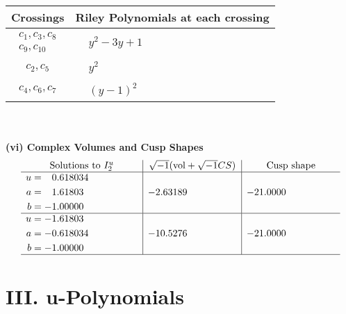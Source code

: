 \documentclass[1p]{elsarticle_modified}
\theoremstyle{definition}
\newcommand{\I}{\sqrt{-1}}
\begin{document}
\begin{tabular}{m{50pt}|m{274pt}}
Crossings & \hspace{64pt}Riley Polynomials at each crossing \\
\hline $$\begin{aligned}c_{1},c_{3},c_{8}\\c_{9},c_{10}\end{aligned}$$&$\begin{aligned}
&y^2-3 y+1
\end{aligned}$\\
\hline $$\begin{aligned}c_{2},c_{5}\end{aligned}$$&$\begin{aligned}
&y^2
\end{aligned}$\\
\hline $$\begin{aligned}c_{4},c_{6},c_{7}\end{aligned}$$&$\begin{aligned}
&(y-1)^2
\end{aligned}$\\
\hline
\end{tabular}\\~\\
\newpage\flushleft \textbf{(vi) Complex Volumes and Cusp Shapes}
$$\begin{array}{c|c|c}  
\text{Solutions to }I^u_{2}& \I (\text{vol} + \sqrt{-1}CS) & \text{Cusp shape}\\
 \hline 
\begin{aligned}
u &= \phantom{-}0.618034\phantom{ +0.000000I} \\
a &= \phantom{-}1.61803\phantom{ +0.000000I} \\
b &= -1.00000\phantom{ +0.000000I}\end{aligned}
 & -2.63189\phantom{ +0.000000I} & -21.0000\phantom{ +0.000000I} \\ \hline\begin{aligned}
u &= -1.61803\phantom{ +0.000000I} \\
a &= -0.618034\phantom{ +0.000000I} \\
b &= -1.00000\phantom{ +0.000000I}\end{aligned}
 & -10.5276\phantom{ +0.000000I} & -21.0000\phantom{ +0.000000I}\\
 \hline 
 \end{array}$$\newpage
\newpage\renewcommand{\arraystretch}{1}
\centering \section*{ III. u-Polynomials}
\end{document}
